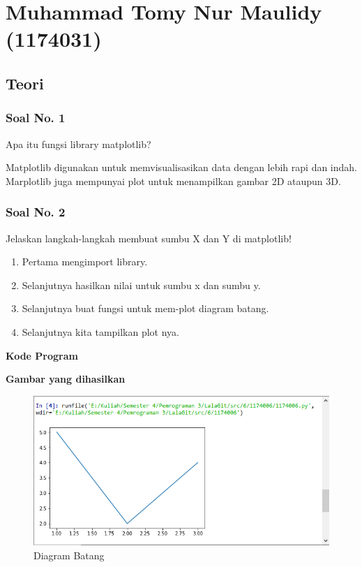 \section{Muhammad Tomy Nur Maulidy (1174031)}
\subsection{Teori}
\subsubsection{Soal No. 1}
\hfill \break
Apa itu fungsi library matplotlib?

\hfill \break
Matplotlib digunakan untuk memvisualisasikan data dengan lebih rapi dan indah. Marplotlib juga mempunyai plot untuk menampilkan gambar 2D ataupun 3D.

\subsubsection{Soal No. 2}
\hfill \break
Jelaskan langkah-langkah membuat sumbu X dan Y di matplotlib!

\begin{enumerate}
	\item Pertama mengimport library.	
	
	
	\item Selanjutnya hasilkan nilai untuk sumbu x dan sumbu y.	
	
	
	\item Selanjutnya buat fungsi untuk mem-plot diagram batang.
		

	\item Selanjutnya kita tampilkan plot nya.
	
	
\end{enumerate}
\hfill \break
\textbf{Kode Program}



\hfill \break
\textbf{Gambar yang dihasilkan}

\begin{figure}[H]
	\includegraphics[width=12cm]{figures/6/1174031/2.png}
	\centering
	\caption{Diagram Batang}
\end{figure}
 
